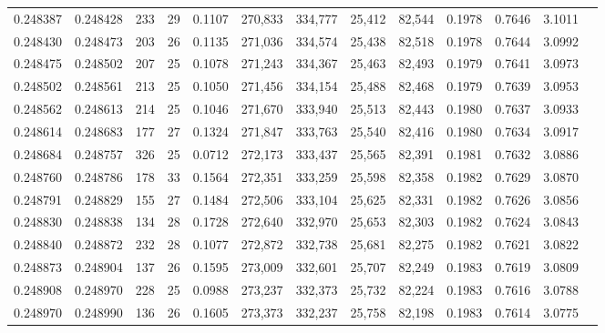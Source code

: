 \begin{tabular}{rrrrrrrrrrrrr}
0.248387 & 0.248428 &   233 &  29 &                                     0.1107 & 270,833 & 334,777 &  25,412 &  82,544 & 0.1978 & 0.7646 & 3.1011 \\
0.248430 & 0.248473 &   203 &  26 &                                     0.1135 & 271,036 & 334,574 &  25,438 &  82,518 & 0.1978 & 0.7644 & 3.0992 \\
0.248475 & 0.248502 &   207 &  25 &                                     0.1078 & 271,243 & 334,367 &  25,463 &  82,493 & 0.1979 & 0.7641 & 3.0973 \\
0.248502 & 0.248561 &   213 &  25 &                                     0.1050 & 271,456 & 334,154 &  25,488 &  82,468 & 0.1979 & 0.7639 & 3.0953 \\
0.248562 & 0.248613 &   214 &  25 &                                     0.1046 & 271,670 & 333,940 &  25,513 &  82,443 & 0.1980 & 0.7637 & 3.0933 \\
0.248614 & 0.248683 &   177 &  27 &                                     0.1324 & 271,847 & 333,763 &  25,540 &  82,416 & 0.1980 & 0.7634 & 3.0917 \\
0.248684 & 0.248757 &   326 &  25 &                                     0.0712 & 272,173 & 333,437 &  25,565 &  82,391 & 0.1981 & 0.7632 & 3.0886 \\
0.248760 & 0.248786 &   178 &  33 &                                     0.1564 & 272,351 & 333,259 &  25,598 &  82,358 & 0.1982 & 0.7629 & 3.0870 \\
0.248791 & 0.248829 &   155 &  27 &                                     0.1484 & 272,506 & 333,104 &  25,625 &  82,331 & 0.1982 & 0.7626 & 3.0856 \\
0.248830 & 0.248838 &   134 &  28 &                                     0.1728 & 272,640 & 332,970 &  25,653 &  82,303 & 0.1982 & 0.7624 & 3.0843 \\
0.248840 & 0.248872 &   232 &  28 &                                     0.1077 & 272,872 & 332,738 &  25,681 &  82,275 & 0.1982 & 0.7621 & 3.0822 \\
0.248873 & 0.248904 &   137 &  26 &                                     0.1595 & 273,009 & 332,601 &  25,707 &  82,249 & 0.1983 & 0.7619 & 3.0809 \\
0.248908 & 0.248970 &   228 &  25 &                                     0.0988 & 273,237 & 332,373 &  25,732 &  82,224 & 0.1983 & 0.7616 & 3.0788 \\
0.248970 & 0.248990 &   136 &  26 &                                     0.1605 & 273,373 & 332,237 &  25,758 &  82,198 & 0.1983 & 0.7614 & 3.0775 \\

\end{tabular}
